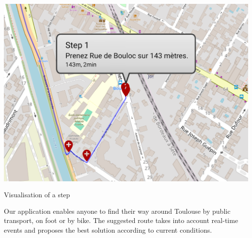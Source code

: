 \begin{center}
\includegraphics[scale=0.30]{content/step_cut.png} 



Visualisation of a step
\end{center}

   

Our application enables anyone to find their way around Toulouse by public transport, on foot or by bike. The suggested route takes into account real-time events and proposes the best solution according to current conditions.
